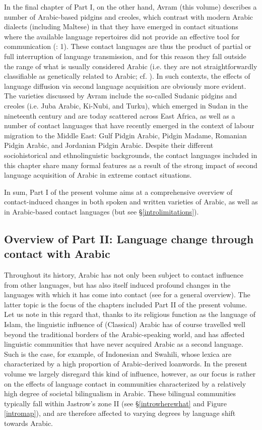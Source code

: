 \documentclass[output=paper]{langsci/langscibook}
\begin{document}
In the final chapter of Part I, on the other hand, Avram (this volume)  describes a number of Arabic-based pidgins and creoles, which contrast with modern Arabic dialects (including Maltese) in that they have emerged in contact situations where the available language repertoires did not provide an effective tool for communication (\citealt{BakkerMatras2013intro}: 1). These contact languages are thus the product of partial or full interruption of language transmission, and for this reason they fall outside the range of what is usually considered Arabic (i.e. they are not straightforwardly classifiable as genetically related to Arabic; cf. \citealt{McMahon2013}). In such contexts, the effects of language diffusion via second language acquisition are obviously more evident. The varieties discussed by Avram include the so-called Sudanic pidgins and creoles (i.e. Juba Arabic, Ki-Nubi, and Turku), which emerged in Sudan in the nineteenth century and are today scattered across East Africa, as well as a number of contact languages that have recently emerged in the context of labour migration to the Middle East: Gulf Pidgin Arabic, Pidgin Madame, Romanian Pidgin Arabic, and Jordanian Pidgin Arabic. Despite their different sociohistorical and ethnolinguistic backgrounds, the contact languages included in this chapter share many formal features as a result of the strong impact of second language acquisition of Arabic in extreme contact situations.

In sum, Part I of the present volume aims at a comprehensive overview of contact-induced changes in both spoken and written varieties of Arabic, as well as in Arabic-based contact languages (but see §\ref{introlimitations}).

\subsection{Overview of Part II: Language change through contact
with Arabic}\label{intropartIIoverview}

Throughout its history, Arabic has not only been subject to contact influence from other languages, but has also itself induced profound changes in the languages with which it has come into contact (see \citealt{Versteegh2001article} for a general overview). The latter topic is the focus of the chapters included Part II of the present volume. Let us note in this regard that, thanks to its religious function as the language of Islam, the linguistic influence of (Classical) Arabic has of course travelled well beyond the traditional borders of the Arabic-speaking world, and has affected linguistic communities that have never acquired Arabic as a second language. Such is the case, for example, of Indonesian and Swahili, whose lexica are characterized by a high proportion of Arabic-derived loanwords. In the present volume we largely disregard this kind of influence, however, as our focus is rather on the effects of language contact in communities characterized by a relatively high degree of societal bilingualism in Arabic. These bilingual communities typically fall within Jastrow’s zone II (see §\ref{introwherewhat} and Figure \ref{intromap}), and are therefore affected to varying degrees by language shift towards Arabic. 
\end{document}
